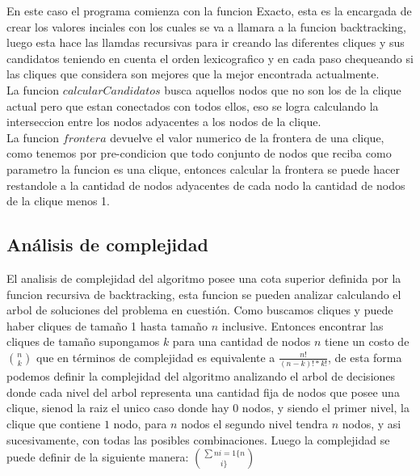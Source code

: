 En este caso el programa comienza con la funcion Exacto, esta es la encargada de crear los valores inciales con los cuales se va a llamara a la funcion backtracking, luego esta hace las llamdas recursivas para ir creando las diferentes cliques y sus candidatos teniendo en cuenta el orden lexicografico y en cada paso chequeando si las cliques que considera son mejores que la mejor encontrada actualmente. \\
La funcion $calcularCandidatos$ busca aquellos nodos que no son los de la clique actual pero que estan conectados con todos ellos, eso se logra calculando la interseccion entre los nodos adyacentes a los nodos de la clique. \\
La funcion $frontera$ devuelve el valor numerico de la frontera de una clique, como tenemos por pre-condicion que todo conjunto de nodos que reciba como parametro la funcion es una clique, entonces calcular la frontera se puede hacer restandole a la cantidad de nodos adyacentes de cada nodo la cantidad de nodos de la clique menos 1. 

\subsection{Análisis de complejidad}

El analisis de complejidad del algoritmo posee una cota superior definida por la funcion recursiva de backtracking, esta funcion se pueden analizar calculando el arbol de soluciones del problema en cuestión. Como buscamos cliques y puede haber cliques de tamaño 1 hasta tamaño $n$ inclusive. Entonces encontrar las cliques de tamaño supongamos $k$ para una cantidad de nodos $n$ tiene un costo de {$n \choose k$} que en términos de complejidad es equivalente a $\frac{n!}{(n-k)!*k!}$, de esta forma podemos definir la complejidad del algoritmo analizando el arbol de decisiones donde cada nivel del arbol representa una cantidad fija de nodos que posee una clique, sienod la raiz el unico caso donde hay 0 nodos, y siendo el primer nivel, la clique que contiene $1$ nodo, para $n$ nodos el segundo nivel tendra $n$ nodos, y asi sucesivamente, con todas las posibles combinaciones. Luego la complejidad se puede definir de la siguiente manera: $\sum{n}{i=1} \{n \choose i\}$	
































